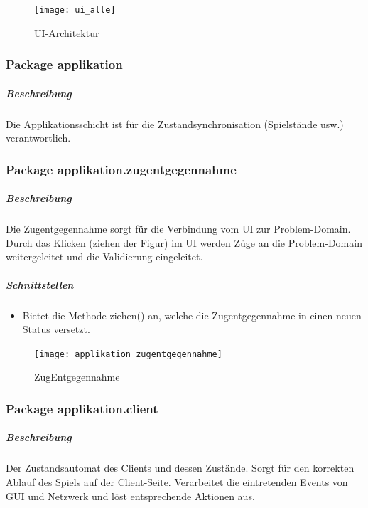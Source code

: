 \documentclass[12pt,halfparskip]{scrartcl}
\begin{document}
\begin{figure}[h]
	\centering
	\texttt{[image: ui\_alle]}
	\caption{UI-Architektur}
	\label{fig:ui_alle}
\end{figure}

\clearpage
\subsubsection{Package applikation} %
\label{ssub:package_applikation}
\subparagraph{Beschreibung}
Die Applikationsschicht ist für die Zustandsynchronisation (Spielstände usw.) verantwortlich. 

\subsubsection{Package applikation.zugentgegennahme} %
\label{ssub:package_applikation_zugentgegennahme}
\subparagraph{Beschreibung}
\label{ssub:beschreibung}
Die Zugentgegennahme sorgt für die Verbindung vom UI zur Problem-Domain. Durch das Klicken (ziehen der Figur) im UI werden Züge an die Problem-Domain weitergeleitet und die Validierung eingeleitet.

\subparagraph{Schnittstellen} %
\label{ssub:schnittstellen}
\begin{itemize}
	\item Bietet die Methode ziehen() an, welche die Zugentgegennahme in einen neuen Status versetzt.
\end{itemize}

\begin{figure}[h]
	\centering
	\texttt{[image: applikation\_zugentgegennahme]}
	\caption{ZugEntgegennahme}
	\label{fig:applikation_zugentgegennahme}
\end{figure}


\clearpage
\subsubsection{Package applikation.client}
\label{ssub:package_applikation_client} %
\subparagraph{Beschreibung}
\label{ssub:beschreibung}
Der Zustandsautomat des Clients und dessen Zustände. Sorgt für den korrekten Ablauf des Spiels auf der Client-Seite. Verarbeitet die eintretenden Events von GUI und Netzwerk und löst entsprechende Aktionen aus.
\end{document}
